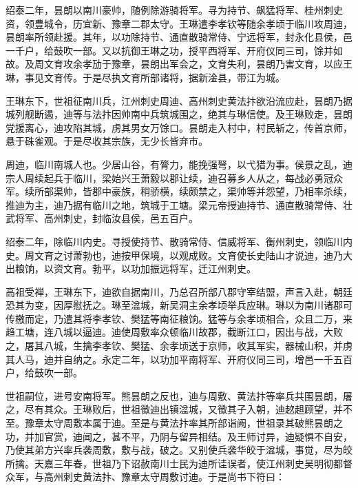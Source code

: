 \documentclass[]{article}
\begin{document}
绍泰二年，昙朗以南川豪帅，随例除游骑将军。寻为持节、飙猛将军、桂州刺史资，领豊城令，历宜新、豫章二郡太守。王琳遣李孝钦等随余孝顷于临川攻周迪，昙朗率所领赴援。其年，以功除持节、通直散骑常侍、宁远将军，封永化县侯，邑一千户，给鼓吹一部。又以抗御王琳之功，授平西将军、开府仪同三司，馀并如故。及周文育攻余孝劢于豫章，昙朗出军会之，文育失利，昙朗乃害文育，以应王琳，事见文育传。于是尽执文育所部诸将，据新淦县，带江为城。

王琳东下，世祖征南川兵，江州刺史周迪、高州刺史黄法抃欲沿流应赴，昙朗乃据城列舰断遏，迪等与法抃因帅南中兵筑城围之，绝其与琳信使。及王琳败走，昙朗党援离心，迪攻陷其城，虏其男女万馀口。昙朗走入村中，村民斩之，传首京师，悬于硃雀观。于是尽收其宗族，无少长皆弃市。

周迪，临川南城人也。少居山谷，有膂力，能挽强弩，以弋猎为事。侯景之乱，迪宗人周续起兵于临川，梁始兴王萧毅以郡让续，迪召募乡人从之，每战必勇冠众军。续所部渠帅，皆郡中豪族，稍骄横，续颇禁之，渠帅等并怨望，乃相率杀续，推迪为主，迪乃据有临川之地，筑城于工塘。梁元帝授迪持节、通直散骑常侍、壮武将军、高州刺史，封临汝县侯，邑五百户。

绍泰二年，除临川内史。寻授使持节、散骑常侍、信威将军、衡州刺史，领临川内史。周文育之讨萧勃也，迪按甲保境，以观成败。文育使长史陆山才说迪，迪乃大出粮饷，以资文育。勃平，以功加振远将军，迁江州刺史。

高祖受禅，王琳东下，迪欲自据南川，乃总召所部八郡守宰结盟，声言入赴，朝廷恐其为变，因厚慰抚之。琳至湓城，新吴洞主余孝顷举兵应琳。琳以为南川诸郡可传檄而定，乃遣其将李孝钦、樊猛等南征粮饷。猛等与余孝顷相合，众且二万，来趋工塘，连八城以逼迪。迪使周敷率众顿临川故郡，截断江口，因出与战，大败之，屠其八城，生擒李孝钦、樊猛、余孝顷送于京师，收其军实，器械山积，并虏其人马，迪并自纳之。永定二年，以功加平南将军、开府仪同三司，增邑一千五百户，给鼓吹一部。

世祖嗣位，进号安南将军。熊昙朗之反也，迪与周敷、黄法抃等率兵共围昙朗，屠之，尽有其众。王琳败后，世祖徵迪出镇湓城，又徵其子入朝，迪趑趄顾望，并不至。豫章太守周敷本属于迪。至是与黄法抃率其所部诣阙，世祖录其破熊昙朗之功，并加官赏，迪闻之，甚不平，乃阴与留异相结。及王师讨异，迪疑惧不自安，乃使其弟方兴率兵袭周敷，敷与战，破之。又别使兵袭华皎于湓城，事觉，尽为皎所擒。天嘉三年春，世祖乃下诏赦南川士民为迪所诖误者，使江州刺史吴明彻都督众军，与高州刺史黄法抃、豫章太守周敷讨迪。于是尚书下符曰：
\end{document}
